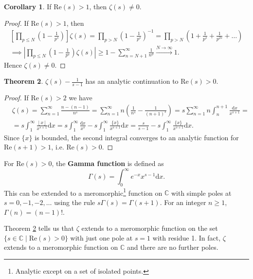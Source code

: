 \documentclass{article}
\theoremstyle{definition}
\newtheorem{theorem}{Theorem}[section]
\newtheorem{cor}[theorem]{Corollary}
\begin{document}

\begin{cor}\label{5.9}
    If $\text{Re}(s)>1$, then $\zeta(s)\neq 0$.
\end{cor}
\begin{proof}
    If $\text{Re}(s) >1$, then 
    \begin{align*}
        \left[\prod_{p\le N}^{} \left(1-\frac{1}{p^s}\right)\right] \zeta(s) = \prod_{p>N}^{} \left(1-\frac{1}{p^s}\right)^{-1} = \prod_{p>N}^{} \left(1+\frac{1}{p^s}+\frac{1}{p^{2s}}+\ldots \right) \\
        \implies \left|\prod_{p\le N}^{} \left(1-\frac{1}{p^s}\right)\zeta(s)\right| \ge 1-\sum_{n=N+1}^{\infty} \frac{1}{n^\sigma} \stackrel{N \to \infty}{\to} 1. 
    \end{align*}
    Hence $\zeta(s) \neq 0$.
\end{proof}
\begin{theorem}\label{5.10}
    $\zeta(s)-\frac{1}{s-1}$ has an analytic continuation to $\text{Re}(s) > 0$.
\end{theorem}
\begin{proof}
    If $\text{Re}(s)>2$ we have 
    \begin{align*}
        &\zeta(s)=\sum_{n=1}^{\infty} \frac{n-(n-1)}{n^s} =\sum_{n=1}^{\infty} n\left(\frac{1}{n^s}-\frac{1}{(n+1)^s}\right) = s \sum_{n=1}^{\infty} n \int_{n}^{n+1} \frac{\mathrm{d}x}{x^{s+1}} = \\
        &=s \int_{1}^{\infty} \frac{\left\lfloor x \right\rfloor}{x^{s+1}} \mathrm{d}x = s \int_{1}^{\infty} \frac{\mathrm{d}x}{x^s} - s \int_{1}^{\infty} \frac{\{x\}}{x^{s+1}} \mathrm{d}x = \frac{s}{s-1} - s \int_{1}^{\infty} \frac{\{x\}}{x^{s+1}}\mathrm{d}x.
    \end{align*}
    Since $\{x\}$ is bounded, the second integral converges to an analytic function for $\text{Re}(s+1)>1$, i.e. $\text{Re}(s)>0$.
\end{proof}
For $\text{Re}(s)>0$, the \textbf{Gamma function} is defined as
\[
\Gamma(s)=\int_{0}^{\infty} e^{-x} x^{s-1} \mathrm{d}x.
\] 
This can be extended to a meromorphic\footnote{Analytic except on a set of isolated points.} function on $\mathbb{C}$ with simple poles at $s=0,-1,-2,\ldots$ using the rule $s \Gamma(s) = \Gamma(s+1)$. For an integer $n\ge 1$, $\Gamma(n)=(n-1)!$.
\vspace{1mm}

Theorem \ref{5.10} tells us that $\zeta$ extends to a meromorphic function on the set $\{s \in \mathbb{C} \mid \text{Re}(s)>0\}$ with just one pole at $s=1$ with residue 1. In fact, $\zeta$ extends to a meromorphic function on $\mathbb{C}$ and there are no further poles.
\end{document}
